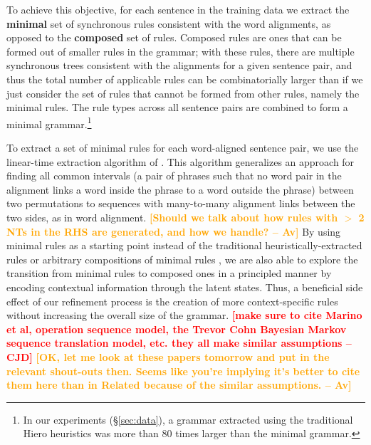 \documentclass[11pt]{article}
\newcommand{\cjd}[1]{\textcolor{red}{\textbf{[#1 --CJD] }}}
\newcommand{\shaycomment}[1]{\textcolor{blue}{#1 -- Shay}}
\newcommand{\avcomment}[1]{\textcolor{orange}{\textbf{[#1 -- Av]}}}
\begin{document}
To achieve this objective, for each sentence in the training data we extract the {\bf minimal} set of synchronous rules consistent with the word alignments, as opposed to the {\bf composed} set of rules.  
Composed rules are ones that can be formed out of smaller rules in the grammar; with these rules, there are multiple synchronous trees consistent with the alignments for a given sentence pair, and thus the total number of applicable rules can be combinatorially larger than if we just consider the set of rules that cannot be formed from other rules, namely the minimal rules.  
The rule types across all sentence pairs are combined to form a minimal grammar.\footnote{In our experiments (\S\ref{sec:data}), a grammar extracted using the traditional Hiero heuristics was more than 80 times larger than the minimal grammar.} 

To extract a set of minimal rules for each word-aligned sentence pair, we use the linear-time extraction algorithm of .  
This algorithm generalizes an approach for finding all common intervals (a pair of phrases such that no word pair in the alignment links a word inside the phrase to a word outside the phrase) between two permutations to sequences with many-to-many alignment links between the two sides, as in word alignment. 
\avcomment{Should we talk about how rules with $>$ 2 NTs in the RHS are generated, and how we handle?}
By using minimal rules as a starting point instead of the traditional heuristically-extracted rules \cite{Chiang2007} or arbitrary compositions of minimal rules \cite{Galley2006}, we are also able to explore the transition from minimal rules to composed ones in a principled manner by encoding contextual information through the latent states.   
Thus, a beneficial side effect of our refinement process is the creation of more context-specific rules without increasing the overall size of the grammar.
\cjd{make sure to cite Marino et al, operation sequence model, the Trevor Cohn Bayesian Markov sequence translation model, etc. they all make similar assumptions}
\avcomment{OK, let me look at these papers tomorrow and put in the relevant shout-outs then.  Seems like you're implying it's better to cite them here than in Related because of the similar assumptions.}
\end{document}
